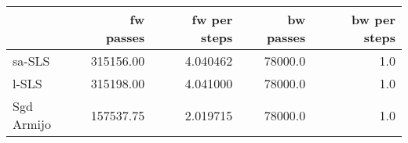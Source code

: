 \begin{tabular}{lrrrr}
\toprule
{} &  fw passes &  fw per steps &  bw passes &  bw per steps \\
\midrule
sa-SLS     &  315156.00 &      4.040462 &    78000.0 &           1.0 \\
l-SLS      &  315198.00 &      4.041000 &    78000.0 &           1.0 \\
Sgd Armijo &  157537.75 &      2.019715 &    78000.0 &           1.0 \\
\bottomrule
\end{tabular}
